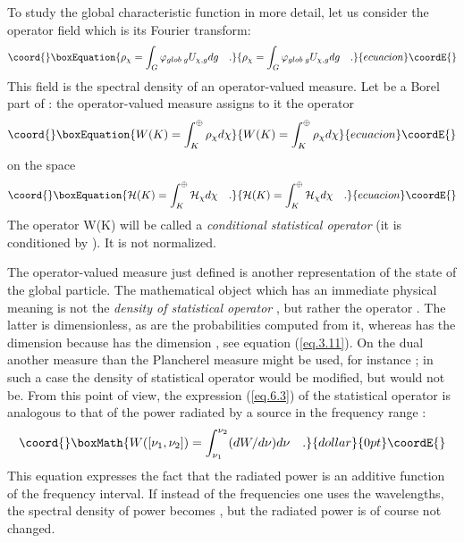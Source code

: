 \documentclass[a4paper,11pt]{article}
\def\Uc#1{U_{\chi,{#1}}}
\begin{document}
To study the global characteristic function in more detail, let us consider the operator field 
which is its Fourier transform:
\begin{equation}\coord{}\boxEquation{
 \label{eq.6.2}
    \rho_{\chi} = \int_G \phi_{glob \; g} \Uc{g} dg  \quad .
}{
 \rho_{\chi} = \int_G \phi_{glob \; g} \Uc{g} dg  \quad .
}{ecuacion}\coordE{}\end{equation}
This field is the spectral density of an operator-valued measure. Let \coordHE{} be a Borel part of 
\coordHE{}: the operator-valued measure assigns to it the operator
\begin{equation}\coord{}\boxEquation{
 \label{eq.6.3}
    W(K) = \int_K^{\oplus} \rho_{\chi} d\chi
}{
 W(K) = \int_K^{\oplus} \rho_{\chi} d\chi
}{ecuacion}\coordE{}\end{equation}
on the space
\begin{equation}\coord{}\boxEquation{
 \label{eq.6.4}
    \mathcal{H}(K) = \int_K^{\oplus} \mathcal{H}_{\chi} d\chi   \quad .
}{
 \mathcal{H}(K) = \int_K^{\oplus} \mathcal{H}_{\chi} d\chi   \quad .
}{ecuacion}\coordE{}\end{equation}
The operator W(K) will be called a {\it conditional statistical operator} (it is conditioned by 
\coordHE{}). It is not normalized. 

The operator-valued measure just defined is another representation of the state of the global 
particle. The mathematical object which has an immediate physical meaning is not the 
{\it density of statistical operator} \myHighlight{$\rho_\chi$}\coordHE{}, but rather the operator \coordHE{}. The latter 
is dimensionless, as are the 
probabilities computed from it, whereas \myHighlight{$\rho_\chi$}\coordHE{} has the dimension \coordHE{} because \coordHE{} 
has the dimension 
\coordHE{}, see equation (\ref{eq.3.11}). On the dual another measure than the Plancherel measure 
might be used, 
for instance \coordHE{}; in such a case the density of statistical operator would be modified, but 
\coordHE{} would not be. From this point of view, the expression (\ref{eq.6.3}) of the statistical 
operator 
is analogous to that of the power radiated by a source in the frequency range \myHighlight{$[\nu_1,\nu_2]$}\coordHE{}:
$$\coord{}\boxMath{
   W([\nu_1,\nu_2]) =\int_{\nu_1}^{\nu_2}  (dW/d\nu) d\nu  \quad .
}{dollar}{0pt}\coordE{}$$
This equation expresses the fact that the radiated power is an additive function of the 
frequency interval. If instead of the frequencies one uses the wavelengths, the spectral 
density of power becomes \coordHE{}, but the radiated power is of 
course not changed. 
\end{document}
